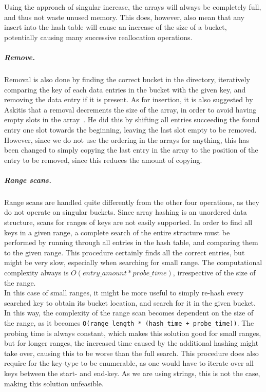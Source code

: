 \documentclass[11pt]{article} %
\begin{document}
Using the approach of singular increase, the arrays will always be completely full, and thus not waste unused memory. This does, however, also mean that any insert into the hash table will cause an increase of the size of a bucket, potentially causing many successive reallocation operations.

\subparagraph{Remove.} Removal is also done by finding the correct bucket in the directory, iteratively comparing the key of each data entries in the bucket with the given key, and removing the data entry if it is present. As for insertion, it is also suggested by Askitis that a removal decrements the size of the array, in order to avoid having empty slots in the array~\cite{NA09}. He did this by shifting all entries succeeding the found entry one slot towards the beginning, leaving the last slot empty to be removed. However, since we do not use the ordering in the arrays for anything, this has been changed to simply copying the last entry in the array to the position of the entry to be removed, since this reduces the amount of copying. 

\subparagraph{Range scans.} Range scans are handled quite differently from the other four operations, as they do not operate on singular buckets. Since array hashing is an unordered data structure, scans for ranges of keys are not easily supported. In order to find all keys in a given range, a complete search of the entire structure must be performed by running through all entries in the hash table, and comparing them to the given range. This procedure certainly finds all the correct entries, but might be very slow, especially when searching for small range. The computational complexity always is $O(entry\_amount * probe\_time)$, irrespective of the size of the range. \\

In this case of small ranges, it might be more useful to simply re-hash every searched key to obtain its bucket location, and search for it in the given bucket. In this way, the complexity of the range scan becomes dependent on the size of the range, as it becomes \verb|O(range_length * (hash_time + probe_time))|. The probing time is always constant, which makes this solution good for small ranges, but for longer ranges, the increased time caused by the additional hashing might take over, causing this to be worse than the full search. This procedure does also require for the key-type to be enumerable, as one would have to iterate over all keys between the start- and end-key. As we are using strings, this is not the case, making this solution unfeasible.
\end{document}
